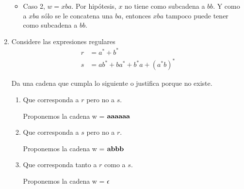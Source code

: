 \documentclass{article}
\begin{document}
\begin{enumerate}
{\begin{enumerate}
{\begin{itemize}
{\begin{itemize}
{                                    $bb$. Y como a $xa$ sólo se le concatena 
                                    una $a$, entonces $xa$ tampoco puede tener
                                    como subcadena a $bb$.
                                }
                                \item {
                                    Caso 2, $w = xba$.
                                    Por hipótesis, $x$ no tiene como subcadena a
                                    $bb$. Y como a $xba$ sólo se le concatena 
                                    una $ba$, entonces $xba$ tampoco puede tener
                                    como subcadena a $bb$.
                                }
                            \end{itemize}
                        }
                    \end{itemize}
                }
            \end{enumerate}
            
        }
        \item {
            Considere las expresiones regulares
            \begin{align*}
                r &= a^* + b^* \\
                s &= ab^* + ba^* + b^*a + (a^*b)^*
            \end{align*}
            
            Da una cadena que cumpla lo siguiente o justifica porque no existe.
            \begin{enumerate}
                \item {
                    Que corresponda a $r$ pero no a $s$.
                    
                    Proponemos la cadena w = $\bf{aaaaaa}$\\
                }
                \item {
                    Que corresponda a $s$ pero no a $r$.
                    
                   Proponemos la cadena w = $\bf{abbb}$\\
                   
                }
                \item {
                    Que corresponda tanto a $r$ como a $s$.
                    
                    Proponemos la cadena w = $\bf{\epsilon}$
                }
            \end{enumerate}
        }
    \end{enumerate}
\end{document}
